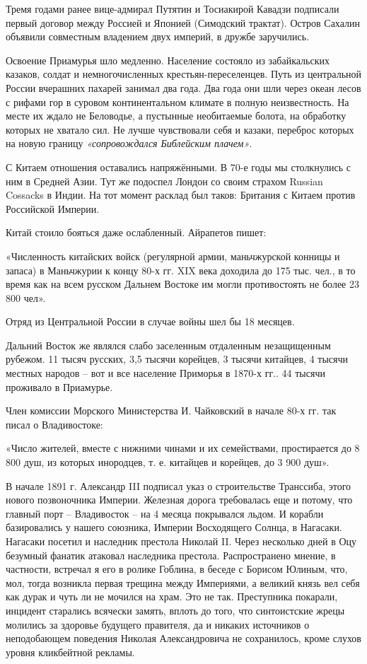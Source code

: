 Тремя годами ранее вице-адмирал Путятин и Тосиакирой Кавадзи подписали первый договор между Россией и Японией (Симодский трактат). Остров Сахалин объявили совместным владением двух империй, в дружбе заручились.

Освоение Приамурья шло медленно. Население состояло из забайкальских казаков, солдат и немногочисленных крестьян-переселенцев. Путь из центральной России вчерашних пахарей занимал два года. Два года они шли через океан лесов с рифами гор в суровом континентальном климате в полную неизвестность. На месте их ждало не Беловодье, а пустынные необитаемые болота, на обработку которых не хватало сил. Не лучше чувствовали себя и казаки, переброс которых на новую границу \textit{«сопровождался Библейским плачем»}.

С Китаем отношения оставались напряжёнными. В 70-е годы мы столкнулись с ним в Средней Азии. Тут же подоспел Лондон со своим страхом Russian Cossacks в Индии. На тот момент расклад был таков: Британия с Китаем против Российской Империи.

Китай стоило бояться даже ослабленный. Айрапетов пишет:
\begin{textcitation}
«Численность китайских войск (регулярной армии, маньчжурской конницы и запаса) в Маньчжурии к концу 80-х гг. XIX века доходила до 175 тыс. чел., в то время как на всем русском Дальнем Востоке им могли противостоять не более 23 800 чел». 
\end{textcitation}
Отряд из Центральной России в случае войны шел бы 18 месяцев.

Дальний Восток же являлся слабо заселенным отдаленным незащищенным рубежом. 11 тысяч русских, 3,5 тысячи корейцев, 3 тысячи китайцев, 4 тысячи местных народов – вот и все население Приморья в 1870-х гг.. 44 тысячи проживало в Приамурье.

Член комиссии Морского Министерства И. Чайковский в начале 80-х гг. так писал о Владивостоке:
\begin{textcitation} 
	«Число жителей, вместе с нижними чинами и их семействами, простирается до 8 800 душ, из которых инородцев, т. е. китайцев и корейцев, до 3 900 душ».
\end{textcitation}

В начале 1891 г. Александр III подписал указ о строительстве Транссиба, этого нового позвоночника Империи. Железная дорога требовалась еще и потому, что главный порт – Владивосток – на 4 месяца покрывался льдом. И корабли базировались у нашего союзника, Империи Восходящего Солнца, в Нагасаки.
Нагасаки посетил и наследник престола Николай II. Через несколько дней в Оцу безумный фанатик атаковал наследника престола. Распространено мнение, в частности, встречал я его в ролике Гоблина, в беседе с Борисом Юлиным, что, мол, тогда возникла первая трещина между Империями, а великий князь вел себя как дурак и чуть ли не мочился на храм. Это не так. Преступника покарали, инцидент старались всячески замять, вплоть до того, что синтоистские жрецы молились за здоровье будущего правителя, да и никаких источников о неподобающем поведения Николая Александровича не сохранилось, кроме слухов уровня кликбейтной рекламы.

